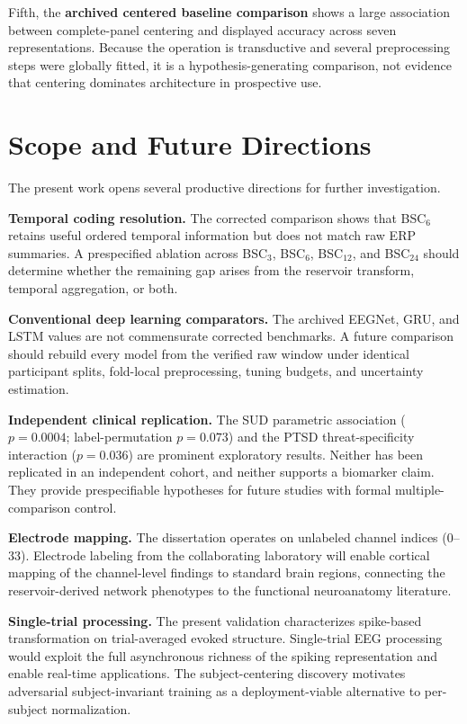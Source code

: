 Fifth, the \textbf{archived centered baseline comparison} shows a large association between complete-panel centering and displayed accuracy across seven representations. Because the operation is transductive and several preprocessing steps were globally fitted, it is a hypothesis-generating comparison, not evidence that centering dominates architecture in prospective use.


\section{Scope and Future Directions}

The present work opens several productive directions for further investigation.

\textbf{Temporal coding resolution.} The corrected comparison shows that BSC$_6$ retains useful ordered temporal information but does not match raw ERP summaries. A prespecified ablation across BSC$_3$, BSC$_6$, BSC$_{12}$, and BSC$_{24}$ should determine whether the remaining gap arises from the reservoir transform, temporal aggregation, or both.

\textbf{Conventional deep learning comparators.} The archived EEGNet, GRU, and LSTM values are not commensurate corrected benchmarks. A future comparison should rebuild every model from the verified raw window under identical participant splits, fold-local preprocessing, tuning budgets, and uncertainty estimation.

\textbf{Independent clinical replication.} The SUD parametric association ($p = 0.0004$; label-permutation $p = 0.073$) and the PTSD threat-specificity interaction ($p = 0.036$) are prominent exploratory results. Neither has been replicated in an independent cohort, and neither supports a biomarker claim. They provide prespecifiable hypotheses for future studies with formal multiple-comparison control.

\textbf{Electrode mapping.} The dissertation operates on unlabeled channel indices ($0$--$33$). Electrode labeling from the collaborating laboratory will enable cortical mapping of the channel-level findings to standard brain regions, connecting the reservoir-derived network phenotypes to the functional neuroanatomy literature.

\textbf{Single-trial processing.} The present validation characterizes spike-based transformation on trial-averaged evoked structure. Single-trial EEG processing would exploit the full asynchronous richness of the spiking representation and enable real-time applications. The subject-centering discovery motivates adversarial subject-invariant training as a deployment-viable alternative to per-subject normalization.

